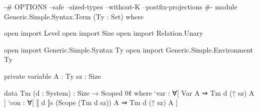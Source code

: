 \begin{code}
{-# OPTIONS --safe --sized-types --without-K --postfix-projections #-}
module Generic.Simple.Syntax.Term (Ty : Set) where

  open import Level
  open import Size
  open import Relation.Unary

  open import Generic.Simple.Syntax Ty
  open import Generic.Simple.Environment Ty

  private
    variable
      A : Ty
      sz : Size

  data Tm (d : System) : Size → Scoped 0ℓ where
    `var : ∀[ Var                      A ⇒ Tm d (↑ sz) A ]
    `con : ∀[ ⟦ d ⟧s (Scope (Tm d sz)) A ⇒ Tm d (↑ sz) A ]
\end{code}
